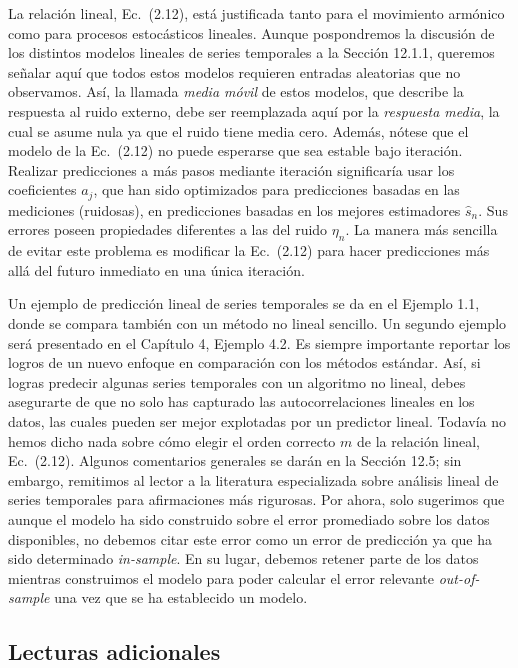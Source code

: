 \documentclass[10pt,a4paper]{book}
\begin{document}
La relación lineal, Ec.~(2.12), está justificada tanto para el movimiento armónico como para procesos estocásticos lineales. Aunque pospondremos la discusión de los distintos modelos lineales de series temporales a la Sección 12.1.1, queremos señalar aquí que todos estos modelos requieren entradas aleatorias que no observamos. Así, la llamada \textit{media móvil} de estos modelos, que describe la respuesta al ruido externo, debe ser reemplazada aquí por la \textit{respuesta media}, la cual se asume nula ya que el ruido tiene media cero. Además, nótese que el modelo de la Ec.~(2.12) no puede esperarse que sea estable bajo iteración. Realizar predicciones a más pasos mediante iteración significaría usar los coeficientes $a_j$, que han sido optimizados para predicciones basadas en las mediciones (ruidosas), en predicciones basadas en los mejores estimadores $\hat{s}_n$. Sus errores poseen propiedades diferentes a las del ruido $\eta_n$. La manera más sencilla de evitar este problema es modificar la Ec.~(2.12) para hacer predicciones más allá del futuro inmediato en una única iteración.  

\bigskip

Un ejemplo de predicción lineal de series temporales se da en el Ejemplo 1.1, donde se compara también con un método no lineal sencillo. Un segundo ejemplo será presentado en el Capítulo 4, Ejemplo 4.2. Es siempre importante reportar los logros de un nuevo enfoque en comparación con los métodos estándar. Así, si logras predecir algunas series temporales con un algoritmo no lineal, debes asegurarte de que no solo has capturado las autocorrelaciones lineales en los datos, las cuales pueden ser mejor explotadas por un predictor lineal. Todavía no hemos dicho nada sobre cómo elegir el orden correcto $m$ de la relación lineal, Ec.~(2.12). Algunos comentarios generales se darán en la Sección 12.5; sin embargo, remitimos al lector a la literatura especializada sobre análisis lineal de series temporales para afirmaciones más rigurosas. Por ahora, solo sugerimos que aunque el modelo ha sido construido sobre el error promediado sobre los datos disponibles, no debemos citar este error como un error de predicción ya que ha sido determinado \textit{in-sample}. En su lugar, debemos retener parte de los datos mientras construimos el modelo para poder calcular el error relevante \textit{out-of-sample} una vez que se ha establecido un modelo.

\newpage

\subsection*{Lecturas adicionales}
\end{document}
